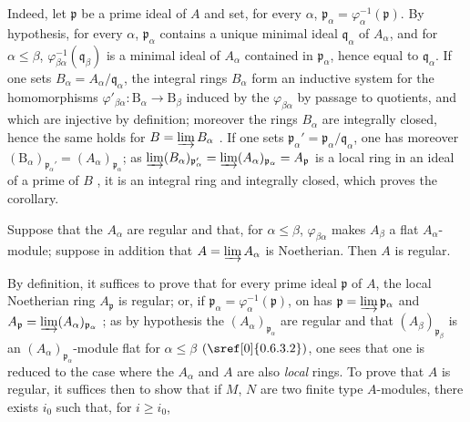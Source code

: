 Indeed, let $\mathfrak{p}$ be a prime ideal of $A$ and set, for every $\alpha$, $\mathfrak{p}_\alpha=\varphi_\alpha^{-1}(\mathfrak{p})$.
By hypothesis, for every $\alpha$, $\mathfrak{p}_\alpha$ contains a unique minimal ideal $\mathfrak{q}_\alpha$ of $A_\alpha$, and for $\alpha\leqslant\beta$, $\varphi_{\beta\alpha}^{-1}(\mathfrak{q}_\beta)$ is a minimal ideal of $A_\alpha$ contained in $\mathfrak{p}_\alpha$, hence equal to $\mathfrak{q}_\alpha$.
If one sets $B_\alpha=A_\alpha/\mathfrak{q}_\alpha$, the integral rings $B_\alpha$ form an inductive system for the homomorphisms $\varphi'_{\beta\alpha}:\mathrm{B}_\alpha\to\mathrm{B}_\beta$ induced by the $\varphi_{\beta\alpha}$ by passage to quotients, and which are injective by definition; moreover the rings $B_\alpha$ are integrally closed, hence the same holds for $B=\varinjlim B_\alpha$ .
If one sets $\mathfrak{p}_\alpha'=\mathfrak{p}_\alpha/\mathfrak{q}_\alpha$, one has moreover $(\mathrm{B}_\alpha)_{\mathfrak{p}_\alpha'}=(A_\alpha)_{\mathfrak{p}_\alpha}$; as $\varinjlim(B_\alpha)_{\mathfrak{p}_\alpha'}=\varinjlim(A_\alpha)_{\mathfrak{p}_\alpha}=A_\mathfrak{p}$ is a local ring in an ideal of a prime of $B$ , it is an integral ring and integrally closed, which proves the corollary.

\begin{proposition}[5.13.7]
\label{IV.5.13.7}
Suppose that the $A_\alpha$ are regular and that, for $\alpha\leqslant\beta$, $\varphi_{\beta\alpha}$ makes $A_\beta$ a flat $A_\alpha$-module; suppose in addition that $A=\varinjlim A_\alpha$ is Noetherian.
Then $A$ is regular.
\end{proposition}

By definition, it suffices to prove that for every prime ideal $\mathfrak{p}$ of $A$, the local Noetherian ring $A_\mathfrak{p}$ is regular; or, if $\mathfrak{p}_\alpha=\varphi_\alpha^{-1}(\mathfrak{p})$, on has $\mathfrak{p}=\varinjlim\mathfrak{p}_\alpha$ and $A_\mathfrak{p}=\varinjlim(A_\alpha)_{\mathfrak{p}_\alpha}$ ; as by hypothesis the $(A_\alpha)_{\mathfrak{p}_\alpha}$ are regular and that $(A_\beta)_{\mathfrak{p}_\beta}$ is an $(A_\alpha)_{\mathfrak{p}_\alpha}$-module flat for $\alpha\leqslant\beta$ $(\sref[0]{0.6.3.2})$, one sees that one is reduced to the case where the $A_\alpha$ and $A$ are also \emph{local} rings.
To prove that $A$ is regular, it suffices then to show that if $M$, $N$ are two finite type $A$-modules, there exists $i_0$ such that, for $i\geqslant i_0$,


